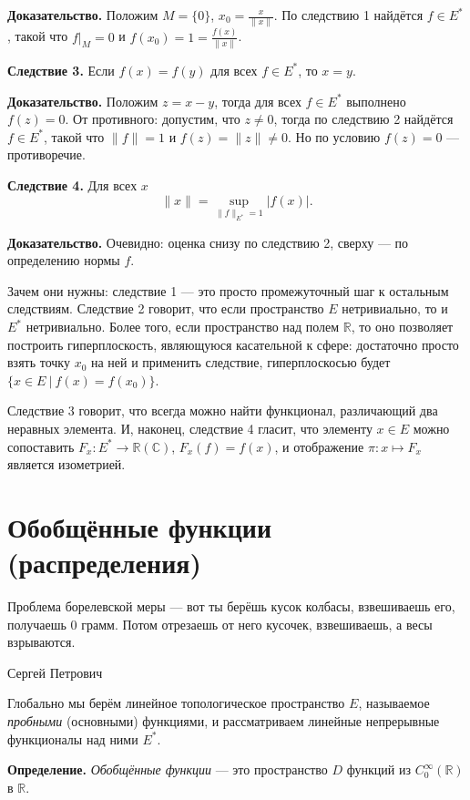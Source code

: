 \textbf{Доказательство.} Положим $M = \{0\}$, $x_0 = \frac{x}{\|x\|}$.
По следствию 1 найдётся $f \in E^*$, такой что $f|_M = 0$ и $f(x_0) = 1 = \frac{f(x)}{\|x\|}$.

\QED

\textbf{Следствие 3.} Если $f(x) = f(y)$ для всех $f \in E^*$, то $x = y$.

\textbf{Доказательство.} Положим $z = x - y$, тогда для всех $f \in E^*$ выполнено $f(z) = 0$.
От противного: допустим, что $z \ne 0$, тогда по следствию 2 найдётся $f \in E^*$, такой что $\|f\| = 1$ и $f(z) = \|z\| \ne 0$.
Но по условию $f(z) = 0$ --- противоречие.

\QED

\textbf{Следствие 4.}
Для всех $x$
\[
    \|x\| = \sup_{\|f\|_{E^*} = 1} |f(x)|.
\]

\textbf{Доказательство.} Очевидно: оценка снизу по следствию 2, сверху --- по определению нормы $f$.

\QED

Зачем они нужны: следствие 1 --- это просто промежуточный шаг к остальным следствиям.
Следствие 2 говорит, что если пространство $E$ нетривиально, то и $E^*$ нетривиально.
Более того, если пространство над полем $\mathbb R$, то оно позволяет построить гиперплоскость, являющуюся касательной к сфере: достаточно просто взять точку $x_0$ на ней и применить следствие, гиперплоскосью будет $\{x \in E~|~ f(x) = f(x_0)\}$.

Следствие 3 говорит, что всегда можно найти функционал, различающий два неравных элемента.
И, наконец, следствие 4 гласит, что элементу $x \in E$ можно сопоставить $F_x: E^* \to \mathbb R(\mathbb C)$, $F_x(f) = f(x)$, и отображение $\pi: x \mapsto F_x$ является изометрией.

\section{Обобщённые функции (распределения)}
\epigraph{
Проблема борелевской меры --- вот ты берёшь кусок колбасы, взвешиваешь его, получаешь 0 грамм.
Потом отрезаешь от него кусочек, взвешиваешь, а весы взрываются.
}{Сергей Петрович}

Глобально мы берём линейное топологическое пространство $E$, называемое \textit{пробными} (основными) функциями, и рассматриваем линейные непрерывные функционалы над ними $E^*$.

\textbf{Определение.} \textit{Обобщённые функции} --- это пространство $D$ функций из $C_0^\infty(\mathbb R)$ в $\mathbb R$.

